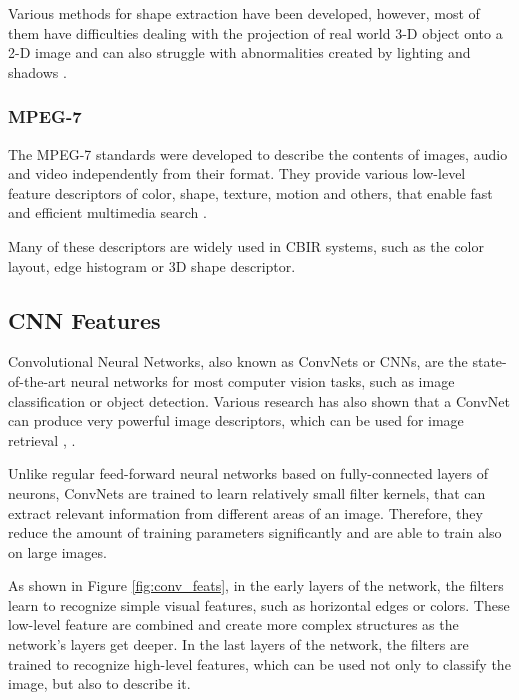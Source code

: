 \documentclass[12pt]{report}
\begin{document}
Various methods for shape extraction have been developed, however, most of them have difficulties dealing with the projection of real world 3-D object onto a 2-D image and can also struggle with abnormalities created by lighting and shadows \cite{zhang2004review}.

\subsubsection{MPEG-7}
The MPEG-7 standards were developed to describe the contents of images, audio and video independently from their format. They provide various low-level feature descriptors of color, shape, texture, motion and others, that enable fast and efficient multimedia search \cite{noauthor_visual_nodate}.

Many of these descriptors are widely used in CBIR systems, such as the color layout, edge histogram or 3D shape descriptor.

\subsection{CNN Features}
Convolutional Neural Networks, also known as ConvNets or CNNs, are the state-of-the-art neural networks for most computer vision tasks, such as image classification or object detection. Various research has also shown that a ConvNet can produce very powerful image descriptors, which can be used for image retrieval \cite{razavian_cnn_2014-2}, \cite{NIPS2012_4824}.

Unlike regular feed-forward neural networks based on fully-connected layers of neurons, ConvNets are trained to learn relatively small filter kernels, that can extract relevant information from different areas of an image. Therefore, they reduce the amount of training parameters significantly and are able to train also on large images.

As shown in Figure \ref{fig:conv_feats}, in the early layers of the network, the filters learn to recognize simple visual features, such as horizontal edges or colors. These low-level feature are combined and create more complex structures as the network's layers get deeper. In the last layers of the network, the filters are trained to recognize high-level features, which can be used not only to classify the image, but also to describe it.
\end{document}
